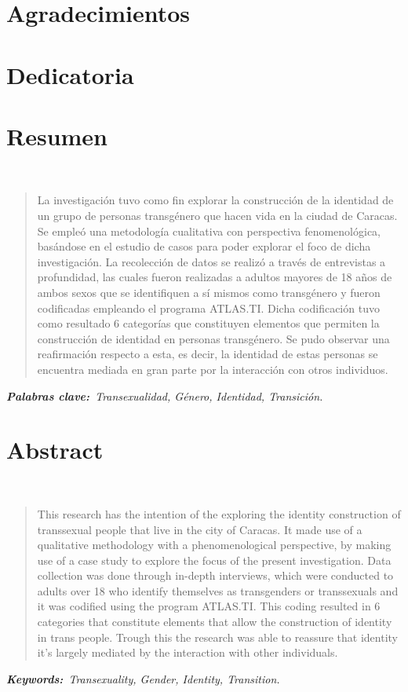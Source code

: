 \chapter{Agradecimientos}

\chapter{Dedicatoria}

\chapter{Resumen}
\begin{center}
	\large\scshape\thetitle\
\end{center}

\begin{quote}
La investigación tuvo como fin explorar la construcción de la identidad
de un grupo de personas transgénero que hacen vida en la ciudad de Caracas.
Se empleó una metodología cualitativa con perspectiva fenomenológica, basándose
en el estudio de casos para poder explorar el foco de dicha investigación.
La recolección de datos se realizó a través de entrevistas a profundidad, las
cuales fueron realizadas a adultos mayores de 18 años de ambos sexos que se
identifiquen a sí mismos como transgénero y fueron codificadas empleando el
programa ATLAS.TI\@.
Dicha codificación tuvo como resultado 6 categorías que constituyen elementos
que permiten la construcción de identidad en personas transgénero.
Se pudo observar una reafirmación respecto a esta, es decir, la identidad de
estas personas se encuentra mediada en gran parte por la interacción con otros
individuos.
\end{quote}

\itshape\textbf{Palabras clave:}\normalfont{}\ Transexualidad, Género, Identidad,
Transición.

\chapter{Abstract}

\begin{center}
	\large\scshape\theengtitle\
\end{center}

\begin{quote}
This research has the intention of the exploring the identity construction of
transsexual people that live in the city of Caracas.
It made use of a qualitative methodology with a phenomenological perspective, by
making use of a case study to explore the focus of the present investigation.
Data collection was done through in-depth interviews, which were conducted to
adults over 18 who identify themselves as transgenders or transsexuals and it
was codified using the program ATLAS\@.TI\@.
This coding resulted in 6 categories that constitute elements that allow the
construction of identity in trans people.
Trough this the research was able to reassure that identity it's largely
mediated by the interaction with other individuals.

\end{quote}

\itshape\textbf{Keywords:}\normalfont{}\ Transexuality, Gender, Identity,
Transition.
